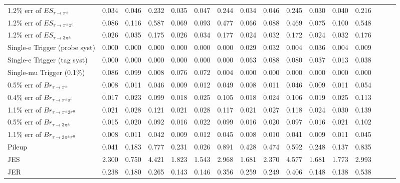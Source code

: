 \begin{tabular}{|l|ccc|ccc|ccc|ccc|ccc|}
      1.2$\%$ err of $ES_{\tau\to\pi^\pm}$       & 0.034 & 0.046 & 0.232 & 0.035 & 0.047 & 0.244 & 0.034 & 0.046 & 0.245 & 0.030 & 0.040 & 0.216 \\ 
      1.2$\%$ err of $ES_{\tau\to\pi^\pm\pi^0}$  & 0.086 & 0.116 & 0.587 & 0.069 & 0.093 & 0.477 & 0.066 & 0.088 & 0.469 & 0.075 & 0.100 & 0.548 \\ 
      1.2$\%$ err of $ES_{\tau\to3\pi^\pm}$      & 0.026 & 0.035 & 0.175 & 0.026 & 0.034 & 0.177 & 0.024 & 0.032 & 0.172 & 0.024 & 0.032 & 0.176 \\ 
      Single-e Trigger (probe syst)              & 0.000 & 0.000 & 0.000 & 0.000 & 0.000 & 0.000 & 0.029 & 0.032 & 0.004 & 0.036 & 0.004 & 0.009 \\ 
      Single-e Trigger (tag syst)                & 0.000 & 0.000 & 0.000 & 0.000 & 0.000 & 0.000 & 0.063 & 0.088 & 0.080 & 0.037 & 0.013 & 0.038 \\ 
      Single-mu Trigger (0.1\%)                  & 0.086 & 0.099 & 0.008 & 0.076 & 0.072 & 0.004 & 0.000 & 0.000 & 0.000 & 0.000 & 0.000 & 0.000 \\ 
      0.5$\%$ err of $Br_{\tau\to\pi^\pm}$       & 0.008 & 0.011 & 0.046 & 0.009 & 0.012 & 0.049 & 0.008 & 0.011 & 0.046 & 0.009 & 0.011 & 0.054 \\ 
      0.4$\%$ err of $Br_{\tau\to\pi^\pm\pi^0}$  & 0.017 & 0.023 & 0.099 & 0.018 & 0.025 & 0.105 & 0.018 & 0.024 & 0.106 & 0.019 & 0.025 & 0.113 \\ 
      1.1$\%$ err of $Br_{\tau\to\pi^\pm2\pi^0}$ & 0.021 & 0.028 & 0.121 & 0.021 & 0.028 & 0.117 & 0.021 & 0.027 & 0.118 & 0.024 & 0.030 & 0.139 \\ 
      0.5$\%$ err of $Br_{\tau\to3\pi^\pm}$      & 0.015 & 0.020 & 0.092 & 0.016 & 0.022 & 0.099 & 0.016 & 0.020 & 0.097 & 0.016 & 0.021 & 0.102 \\ 
      1.1$\%$ err of $Br_{\tau\to3\pi^\pm\pi^0}$ & 0.008 & 0.011 & 0.042 & 0.009 & 0.012 & 0.045 & 0.008 & 0.010 & 0.041 & 0.009 & 0.011 & 0.045 \\ 
      Pileup                                     & 0.041 & 0.183 & 0.777 & 0.231 & 0.026 & 0.891 & 0.428 & 0.474 & 0.592 & 0.248 & 0.137 & 0.835 \\ 
      JES                                        & 2.300 & 0.750 & 4.421 & 1.823 & 1.543 & 2.968 & 1.681 & 2.370 & 4.577 & 1.681 & 1.773 & 2.993 \\ 
      JER                                        & 0.238 & 0.180 & 0.265 & 0.143 & 0.146 & 0.356 & 0.259 & 0.249 & 0.406 & 0.148 & 0.138 & 0.538 \\ 

\end{tabular}
